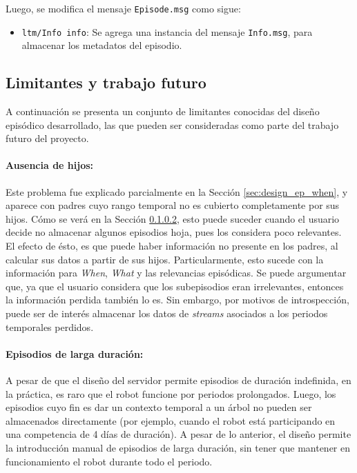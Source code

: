 Luego, se modifica el mensaje \texttt{Episode.msg} como sigue:
\begin{itemize}
	\item \texttt{ltm/Info info}: Se agrega una instancia del mensaje \texttt{Info.msg}, para almacenar los metadatos del episodio.
\end{itemize}


\subsection{Limitantes y trabajo futuro}


A continuación se presenta un conjunto de limitantes conocidas del diseño episódico desarrollado, las que pueden ser consideradas como parte del trabajo futuro del proyecto.

\paragraph{Ausencia de hijos:} Este problema fue explicado parcialmente en la Sección \ref{sec:design_ep_when}, y aparece con padres cuyo rango temporal no es cubierto completamente por sus hijos. Cómo se verá en la Sección \ref{}, esto puede suceder cuando el usuario decide no almacenar algunos episodios hoja, pues los considera poco relevantes. El efecto de ésto, es que puede haber información no presente en los padres, al calcular sus datos a partir de sus hijos. Particularmente, esto sucede con la información para \textit{When}, \textit{What} y las relevancias episódicas. Se puede argumentar que, ya que el usuario considera que los subepisodios eran irrelevantes, entonces la información perdida también lo es. Sin embargo, por motivos de introspección, puede ser de interés almacenar los datos de \textit{streams} asociados a los periodos temporales perdidos.

\paragraph{Episodios de larga duración:}
A pesar de que el diseño del servidor permite episodios de duración indefinida, en la práctica, es raro que el robot funcione por periodos prolongados. Luego, los episodios cuyo fin es dar un contexto temporal a un árbol no pueden ser almacenados directamente (por ejemplo, cuando el robot está participando en una competencia de 4 días de duración). A pesar de lo anterior, el diseño permite la introducción manual de episodios de larga duración, sin tener que mantener en funcionamiento el robot durante todo el periodo.

